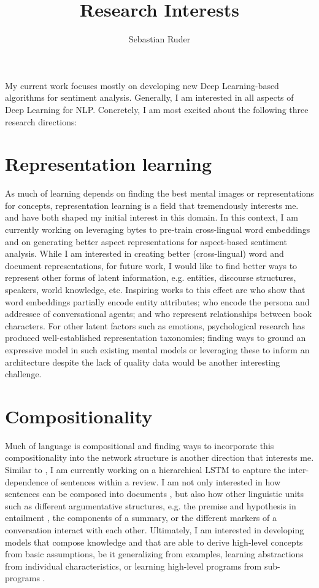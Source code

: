 \documentclass[11pt]{article}
\title{Research Interests}
\author{Sebastian Ruder}
\begin{document}
\maketitle

My current work focuses mostly on developing new Deep Learning-based algorithms for sentiment analysis. Generally, I am interested in all aspects of Deep Learning for NLP. Concretely, I am most excited about the following three research directions:

\section{Representation learning}

As much of learning depends on finding the best mental images or representations for concepts, representation learning is a field that tremendously interests me. \cite{Mikolov2013d} and \cite{Le2014a} have both shaped my initial interest in this domain. In this context, I am currently working on leveraging bytes to pre-train cross-lingual word embeddings and on generating better aspect representations for aspect-based sentiment analysis. While I am interested in creating better (cross-lingual) word and document representations, for future work, I would like to find better ways to represent other forms of latent information, e.g. entities, discourse structures, speakers, world knowledge, etc. Inspiring works to this effect are \cite{Gupta2015} who show that word embeddings partially encode entity attributes; \cite{Li2016a} who encode the persona and addressee of conversational agents; and \cite{Iyyer2016} who represent relationships between book characters. For other latent factors such as emotions, psychological research has produced well-established representation taxonomies; finding ways to ground an expressive model in such existing mental models or leveraging these to inform an architecture despite the lack of quality data would be another interesting challenge.

\section{Compositionality}

Much of language is compositional and finding ways to incorporate this compositionality into the network structure is another direction that interests me. Similar to \cite{Kotzias2015}, I am currently working on a hierarchical LSTM to capture the inter-dependence of sentences within a review. I am not only interested in how sentences can be composed into documents \cite{Li2015d}, but also how other linguistic units such as different argumentative structures, e.g. the premise and hypothesis in entailment \cite{Rocktaschel2015}, the components of a summary, or the different markers of a conversation interact with each other. Ultimately, I am interested in developing models that compose knowledge and that are able to derive high-level concepts from basic assumptions, be it generalizing from examples, learning abstractions from individual characteristics, or learning high-level programs from sub-programs \cite{Reed2015}.
\end{document}
